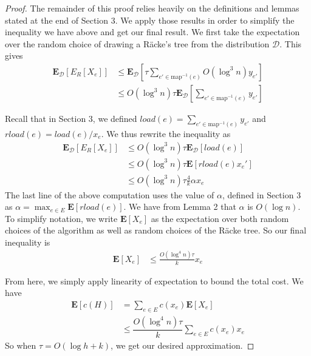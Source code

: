 \documentclass[12pt]{article}
\begin{document}
\begin{proof}
The remainder of this proof relies heavily on the definitions and lemmas stated at the end of Section 3. We apply those results in order to simplify the inequality we have above and get our final result. We first take the expectation over the random choice of drawing a R\"{a}cke's tree from the distribution $\mathcal{D}$. This gives
\begin{align}
\textbf{E}_{\mathcal{D}}[E_{R}[X_e]] &\leq \textbf{E}_{\mathcal{D}}[\tau \sum_{e' \in \mathrm{map}^{-1}(e)} O(\log^3 n) y_{e'}] \\
               &\leq O(\log^3 n) \tau \textbf{E}_{\mathcal{D}}[\sum_{e' \in \mathrm{map}^{-1}(e)} y_{e'}]
\end{align}

Recall that in Section 3, we defined $load(e) = \sum_{e' \in \mathrm{map}^{-1}(e)} y_{e'}$ and $rload(e) = load(e)/x_e$. We thus rewrite the inequality as
\begin{align}
              \textbf{E}_{\mathcal{D}}[E_{R}[X_e]]  & \leq O(\log^3 n) \tau \textbf{E}_{\mathcal{D}}[load(e)]\\
&\leq O(\log^3 n) \tau \textbf{E}[rload(e) x_e'] \\
                &\leq O(\log^3 n) \tau \frac{4}{k} \alpha x_e
\end{align}
The last line of the above computation uses the value of $\alpha$, defined in Section 3 as $\alpha = \max_{e \in E}\textbf{E}[rload(e)]$. We have from Lemma 2 that $\alpha$ is $O(\log n)$. To simplify notation, we write $\textbf{E}[X_e]$ as the expectation over both random choices of the algorithm as well as random choices of the R\"{a}cke tree. So our final inequality is 
\begin{align}
 \textbf{E}[X_e] &\leq \frac{O(\log^4 n)\tau}{k} x_e 
\end{align}

From here, we simply apply linearity of expectation to bound the total cost. We have 
%
%
\begin{align}
\textbf{E}[c(H)] &= \sum_{e \in E} c(x_e)\textbf{E}[X_e] \\
                 &\leq \dfrac{O(\log^4 n)\tau}{k} \sum_{e \in E} c(x_e) x_e
\end{align}
So when $\tau = O(\log h + k)$, we get our desired approximation.
\end{proof}
\end{document}

